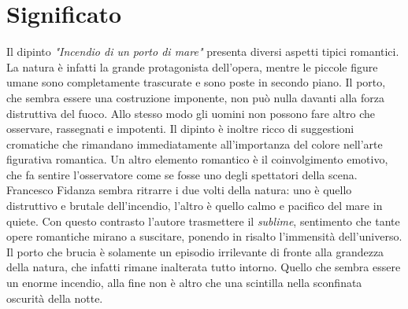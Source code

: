 \documentclass[12pt]{article}
\begin{document}
\newpage
\section*{Significato}
Il dipinto \textit{"Incendio di un porto di mare"} presenta diversi aspetti tipici romantici. La natura è infatti la grande protagonista dell'opera, mentre le piccole figure umane sono completamente trascurate e sono poste in secondo piano. Il porto, che sembra essere una costruzione imponente, non può nulla davanti alla forza distruttiva del fuoco. Allo stesso modo gli uomini non possono fare altro che osservare, rassegnati e impotenti. Il dipinto è inoltre ricco di suggestioni cromatiche che rimandano immediatamente all'importanza del colore nell'arte figurativa romantica. Un altro elemento romantico è il coinvolgimento emotivo, che fa sentire l'osservatore come se fosse uno degli spettatori della scena. \\
Francesco Fidanza sembra ritrarre i due volti della natura: uno è quello distruttivo e brutale dell'incendio, l'altro è quello calmo e pacifico del mare in quiete. Con questo contrasto l'autore trasmettere il \textit{sublime}, sentimento che tante opere romantiche mirano a suscitare, ponendo in risalto l'immensità dell'universo. Il porto che brucia è solamente un episodio irrilevante di fronte alla grandezza della natura, che infatti rimane inalterata tutto intorno. Quello che sembra essere un enorme incendio, alla fine non è altro che una scintilla nella sconfinata oscurità della notte.
\end{document}
